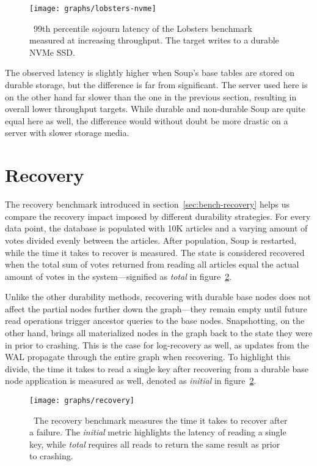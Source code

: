 \begin{figure}[H]
  \texttt{[image: graphs/lobsters-nvme]}
  \caption{\
    99th percentile sojourn latency of the Lobsters benchmark measured at
    increasing throughput. The \code{rocksdb\_soup} target writes to a durable
    NVMe SSD.\@
  }\label{fig:lobsters-nvme}
\end{figure}

The observed latency is slightly higher when Soup's base tables are stored on
durable storage, but the difference is far from significant. The server used
here is on the other hand far slower than the one in the previous section,
resulting in overall lower throughput targets. While durable and non-durable
Soup are quite equal here as well, the difference would without doubt be more
drastic on a server with slower storage media.

\section{Recovery}

The recovery benchmark introduced in section~\ref{sec:bench-recovery} helps us
compare the recovery impact imposed by different durability strategies. For
every data point, the database is populated with 10K articles and a varying
amount of votes divided evenly between the articles. After population, Soup is
restarted, while the time it takes to recover is measured. The state is
considered recovered when the total sum of votes returned from reading all
articles equal the actual amount of votes in the system---signified as
\textit{total} in figure~\ref{fig:graph-recovery}.

Unlike the other durability methods, recovering with durable base nodes does not
affect the partial nodes further down the graph---they remain empty until future
read operations trigger ancestor queries to the base nodes. Snapshotting, on the
other hand, brings all materialized nodes in the graph back to the state they
were in prior to crashing. This is the case for log-recovery as well, as updates
from the WAL propagate through the entire graph when recovering. To highlight
this divide, the time it takes to read a single key after recovering from a
durable base node application is measured as well, denoted as \textit{initial}
in figure~\ref{fig:graph-recovery}.

\begin{figure}[H]
  \texttt{[image: graphs/recovery]}
  \caption{\
    The recovery benchmark measures the time it takes to recover after
    a failure. The \textit{initial} metric highlights the latency of reading a
    single key, while \textit{total} requires all reads to return the same
    result as prior to crashing.
  }\label{fig:graph-recovery}
\end{figure}

